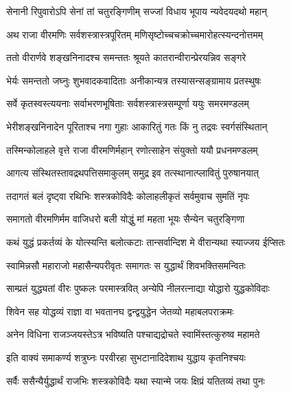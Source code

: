 \twolineshloka
{सेनानी रिपुवारोऽपि सेनां तां चतुरङ्गिणीम्}
{सज्जां विधाय भूपाय न्यवेदयदथो महान्}%

\twolineshloka
{अथ राजा वीरमणिः सर्वशस्त्रास्त्रपूरितम्}
{मणिसृष्टोच्चचक्रोच्चमारोहत्स्यन्दनोत्तमम्}%

\twolineshloka
{ततो वीरार्णवे शङ्खनिनादश्च समन्ततः}
{श्रूयते कातरान्वीरान्प्रेरयन्निव सङ्गरे}%

\twolineshloka
{भेर्यः समन्ततो जघ्नुः शुभवादकवादिताः}
{अनीकान्यत्र तस्यासन्सङ्ग्रामाय प्रतस्थुषः}%

\twolineshloka
{सर्वे कृतस्वस्त्ययनाः सर्वाभरणभूषिताः}
{सर्वशस्त्रास्त्रसम्पूर्णा ययुः समरमण्डलम्}%

\twolineshloka
{भेरीशङ्खनिनादेन पूरिताश्च नगा गुहाः}
{आकारितुं गतः किं नु तद्रवः स्वर्गसंस्थितान्}%

\twolineshloka
{तस्मिन्कोलाहले वृत्ते राजा वीरमणिर्महान्}
{रणोत्साहेन संयुक्तो ययौ प्रधनमण्डलम्}%

\twolineshloka
{आगत्य संस्थितस्तावद्रथपत्तिसमाकुलम्}
{समुद्र इव तत्स्थानात्प्लावितुं पुरुषानयात्}%

\twolineshloka
{तदागतं बलं दृष्ट्वा रथिभिः शस्त्रकोविदैः}
{कोलाहलीकृतं सर्वमुवाच सुमतिं नृपः}%


\twolineshloka
{समागतो वीरमणिर्मम वाजिधरो बली}
{योद्धुं मां महता भूयः सैन्येन चतुरङ्गिणा}%

\twolineshloka
{कथं युद्धं प्रकर्तव्यं के योत्स्यन्ति बलोत्कटाः}
{तान्सर्वान्दिश मे वीरान्यथा स्याज्जय ईप्सितः}%


\twolineshloka
{स्वामिन्नसौ महाराजो महासैन्यपरीवृतः}
{समागतः स युद्धार्थं शिवभक्तिसमन्वितः}%

\twolineshloka
{साम्प्रतं युद्ध्यतां वीरः पुष्कलः परमास्त्रवित्}
{अन्येपि नीलरत्नाद्या योद्धारो युद्धकोविदाः}%

\twolineshloka
{शिवेन सह योद्धव्यं राज्ञा वा भवतानघ}
{द्वन्द्वयुद्धेन जेतव्यो महाबलपराक्रमः}%

\twolineshloka
{अनेन विधिना राजञ्जयस्तेऽत्र भविष्यति}
{पश्चाद्यद्रोचते स्वामिंस्तत्कुरुष्व महामते}%


\twolineshloka
{इति वाक्यं समाकर्ण्य शत्रुघ्नः परवीरहा}
{सुभटानादिदेशाथ युद्धाय कृतनिश्चयः}%

\twolineshloka
{सर्वैः ससैन्यैर्युद्धार्थं राजभिः शस्त्रकोविदैः}
{यथा स्यान्मे जयः क्षिप्रं यतितव्यं तथा पुनः}%

